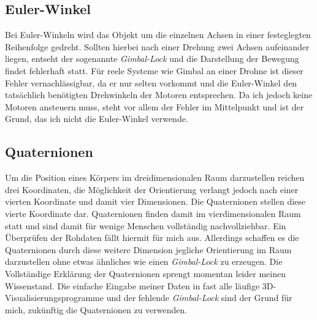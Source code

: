 \subsection{Euler-Winkel}
Bei Euler-Winkeln wird das Objekt um die einzelnen Achsen in einer festeglegten Reihenfolge gedreht. Sollten hierbei 
nach einer Drehung zwei Achsen aufeinander liegen, entseht der sogenannte \textit{Gimbal-Lock} und die Darstellung
der Bewegung findet fehlerhaft statt. Für reele Systeme wie Gimbal an einer Drohne ist dieser Fehler vernachlässigbar,
da er nur selten vorkommt und die Euler-Winkel den tatsächlich benötigten Drehwinkeln der Motoren entsprechen.
Da ich jedoch keine Motoren ansteuern muss, steht vor allem der Fehler im Mittelpunkt und ist der Grund, das ich nicht
die Euler-Winkel verwende.  

\subsection{Quaternionen}
Um die Position eines Körpers im dreidimensionalen Raum darzustellen reichen drei Koordinaten, 
die Möglichkeit der Orientierung verlangt jedoch nach einer vierten Koordinate und damit vier Dimensionen. 
Die Quaternionen stellen diese vierte Koordinate dar. Quaternionen finden damit im vierdimensionalen Raum statt
und sind damit für wenige Menschen vollständig nachvollziehbar. Ein Überprüfen der Rohdaten fällt hiermit für mich aus.
Allerdings schaffen es die Quaternionen durch diese weitere Dimension jegliche Orientierung im Raum darzustellen ohne
etwas ähnliches wie einen \textit{Gimbal-Lock} zu erzeugen. Die Vollständige Erklärung der Quaternionen sprengt momentan
leider meinen Wissenstand. Die einfache Eingabe meiner Daten in fast alle läufige 3D-Visualisierungsprogramme und 
der fehlende \textit{Gimbal-Lock} sind der Grund für mich, zukünftig die Quaternionen zu verwenden.